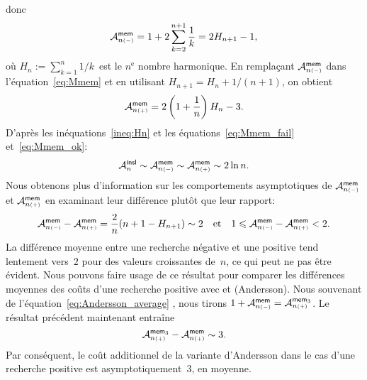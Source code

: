 donc
\begin{equation}
\abovedisplayskip=-6pt
\abovedisplayshortskip=-6pt
\M{\fun{mem}}{n{\scriptscriptstyle (-)}} =
1 + 2 \sum_{k=2}^{n+1}\frac{1}{k} = 2H_{n+1} - 1,
\index{mem@$\M{\fun{mem}}{n{\scriptscriptstyle (-)}}$}
\label{eq:Mmem_fail}
\end{equation}
où \(H_n := \sum_{k=1}^{n}1/k\)~est le \(n^\text{e}\) nombre
harmonique. En remplaçant
\(\M{\fun{mem}}{n{\scriptscriptstyle (-)}}\) dans
l'équation~\eqref{eq:Mmem} et en utilisant \(H_{n+1} = H_n +
1/(n+1)\), on obtient
\begin{equation}
\M{\fun{mem}}{n{\scriptscriptstyle (+)}} =
2\left(1+\frac{1}{n}\right)H_n - 3.
\index{mem@$\M{\fun{mem}}{n{\scriptscriptstyle (+)}}$}
\label{eq:Mmem_ok}
\end{equation}
D'après les inéquations~\eqref{ineq:Hn}  et
les équations~\eqref{eq:Mmem_fail} et~\eqref{eq:Mmem_ok}:
\begin{equation*}
\M{\fun{insl}}{n}
\sim \M{\fun{mem}}{n{\scriptscriptstyle (-)}}
\sim \M{\fun{mem}}{n{\scriptscriptstyle (+)}} \sim 2 \ln n.
\end{equation*}
Nous obtenons plus d'information sur les comportements asymptotiques
de \(\M{\fun{mem}}{n{\scriptscriptstyle(-)}}\) et
\(\M{\fun{mem}}{n{\scriptscriptstyle(+)}}\) en examinant leur
différence plutôt que leur rapport:
\begin{equation*}
\M{\fun{mem}}{n{\scriptscriptstyle (-)}} -
\M{\fun{mem}}{n{\scriptscriptstyle (+)}} =
\frac{2}{n}(n + 1 - H_{n+1}) \sim 2
\quad\text{et}\quad
1 \leqslant \M{\fun{mem}}{n{\scriptscriptstyle (-)}} -
\M{\fun{mem}}{n{\scriptscriptstyle (+)}} < 2.
\end{equation*}
La différence moyenne entre une recherche négative et une positive
tend lentement vers~\(2\) pour des valeurs croissantes de~\(n\), ce
qui peut ne pas être évident. Nous pouvons faire usage de ce résultat
pour comparer les différences moyennes des coûts d'une recherche
positive avec  et  (Andersson). Nous
souvenant de l'équation~\eqref{eq:Andersson_average}
, nous tirons \(1 +
\M{\fun{mem}}{n{\scriptscriptstyle (-)}} =
\M{\fun{mem}_3}{n{\scriptscriptstyle (+)}}\). Le résultat précédent
maintenant entraîne
\begin{equation*}
  \M{\fun{mem}_3}{n{\scriptscriptstyle (+)}} -
  \M{\fun{mem}}{n{\scriptscriptstyle (+)}} \sim 3.
\index{mem3@$\M{\fun{mem}_3}{n{\scriptscriptstyle (+)}}$}
\end{equation*}
Par conséquent, le coût additionnel de la variante d'Andersson dans le
cas d'une recherche positive est asymptotiquement~\(3\), en moyenne.

